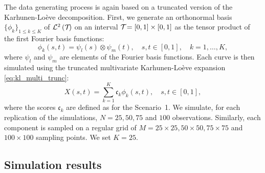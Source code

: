 \begin{scenario}
The data generating process is again based on a truncated version of the Karhunen-Loève decomposition. First, we generate an orthonormal basis $\{\phi_k\}_{1 \leq k \leq K}$ of $\mathcal{L}^{2}\left(\mathcal{T}_{}\right)$ on an interval $\mathcal{T}_{} = [0, 1] \times [0, 1]$ as the tensor product of the first Fourier basis functions:
\begin{equation}
    \phi_k(s, t) = \psi_l(s) \otimes \psi_m(t), \quad s, t \in [0, 1],\quad k = 1, \dots, K,
\end{equation}
where $\psi_l$ and $\psi_m$ are elements of the Fourier basis functions.
Each curve is then simulated using the truncated multivariate Karhunen-Loève expansion \eqref{eq:kl_multi_trunc}:
\begin{equation}
    X(s, t) = \sum_{k = 1}^K \mathfrak{c}_k \phi_k(s, t), \quad s, t \in [0, 1],
\end{equation}
where the scores $\mathfrak{c}_k$ are defined as for the Scenario~1. We simulate, for each replication of the simulations, $N = 25, 50, 75$ and $100$ observations. Similarly, each component is sampled on a regular grid of $M = 25 \times 25, 50 \times 50, 75 \times 75$ and $100 \times 100$ sampling points. We set $K = 25$.
\end{scenario}


\subsection{Simulation results} %
\label{sub:simulation_results}

